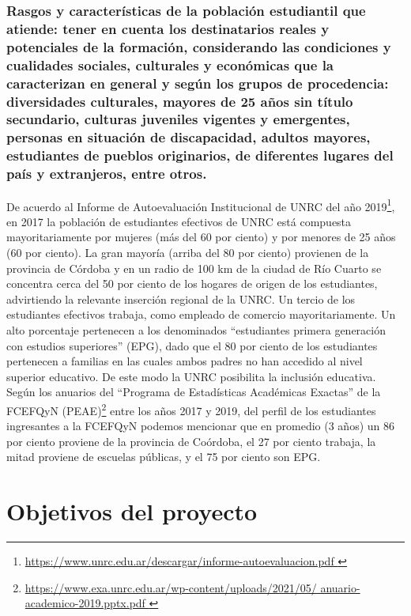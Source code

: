 \documentclass[a4paper, 12pt]{article}
\begin{document}
\subsubsection{Rasgos y características de la población estudiantil que atiende: tener en cuenta los destinatarios reales y potenciales de la formación, considerando las condiciones y cualidades sociales, culturales y económicas que la caracterizan en general y según los grupos de procedencia: diversidades culturales, mayores de 25 años sin título secundario, culturas juveniles vigentes y emergentes, personas en situación de discapacidad, adultos mayores, estudiantes de pueblos originarios, de diferentes lugares del país y extranjeros, entre otros.}

De acuerdo al Informe de Autoevaluación Institucional de UNRC del
año 2019\footnote{\href{https://www.unrc.edu.ar/descargar/informe-autoevaluacion.pdf}{https://www.unrc.edu.ar/descargar/informe-autoevaluacion.pdf
}
}, en 2017 la población de estudiantes efectivos de UNRC está
compuesta mayoritariamente por mujeres (más del 60 por ciento) y por
menores de 25 años (60 por ciento). La gran mayoría (arriba del 80 por
ciento) provienen de la provincia de Córdoba y en un radio de 100 km
de la ciudad de Río Cuarto se concentra cerca del 50 por ciento de los
hogares de origen de los estudiantes, advirtiendo la relevante inserción
regional de la UNRC. Un tercio de los estudiantes efectivos trabaja, como
empleado de comercio mayoritariamente. Un alto porcentaje pertenecen
a los denominados “estudiantes primera generación con estudios superiores” (EPG), dado que el 80 por ciento de los estudiantes pertenecen
a familias en las cuales ambos padres no han accedido 
al nivel superior educativo. De este modo la UNRC posibilita la inclusión
educativa.
Según los anuarios del “Programa de Estadísticas Académicas Exactas” de la FCEFQyN (PEAE)\footnote{\href{
https://www.exa.unrc.edu.ar/wp-content/uploads/2021/05/
anuario-academico-2019.pptx.pdf
}{https://www.exa.unrc.edu.ar/wp-content/uploads/2021/05/
anuario-academico-2019.pptx.pdf
}} entre los años 2017 y 2019, del perfil de
los estudiantes ingresantes a la FCEFQyN podemos mencionar que en promedio (3 años) un 86 por ciento proviene de la provincia de Coórdoba, el
27 por ciento trabaja, la mitad proviene de escuelas públicas, y el 75 por
ciento son EPG. 

\section{Objetivos del proyecto}
\end{document}
